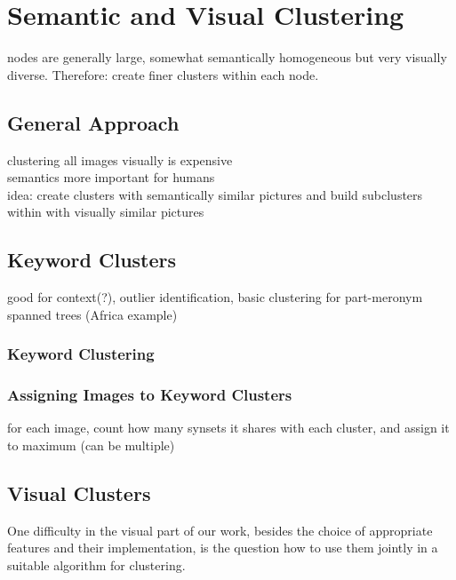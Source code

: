 %
\section{Semantic and Visual Clustering}
\label{sec_inhalt}

nodes are generally large, somewhat semantically homogeneous but very visually diverse. Therefore: create finer clusters within each node.

\subsection{General Approach}
clustering all images visually is expensive \\
semantics more important for humans \\
idea: create clusters with semantically similar pictures and build subclusters within with visually similar pictures

\subsection{Keyword Clusters}
good for context(?), outlier identification, basic clustering for part-meronym spanned trees (Africa example)

\subsubsection{Keyword Clustering}


\subsubsection{Assigning Images to Keyword Clusters}
for each image, count how many synsets it shares with each cluster, and assign it to maximum (can be multiple)


\subsection{Visual Clusters}

One difficulty in the visual part of our work, besides the choice of appropriate features and their implementation, is the question how to use them jointly in a suitable algorithm for clustering. 

